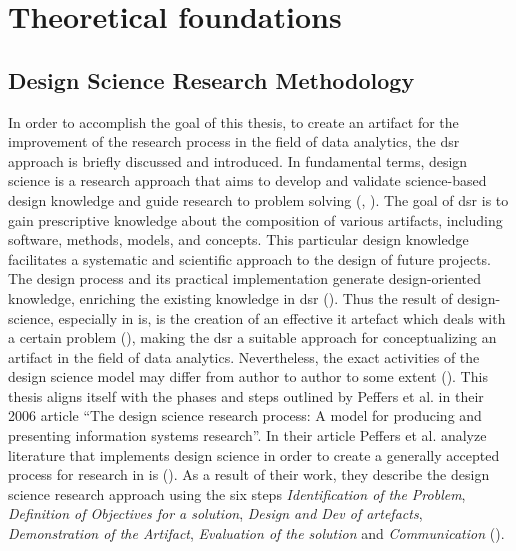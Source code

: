 \section{Theoretical foundations}


\subsection{Design Science Research Methodology}

In order to accomplish the goal of this thesis, to create an artifact for the improvement of the research process in the field of data analytics, the \ac{dsr} approach  is briefly discussed and introduced. In fundamental terms, design science is a research approach that aims to develop and validate science-based design knowledge and guide research to problem solving (\cite{Hevner.2004}, \cite{Dresch.2015}). The goal of \ac{dsr} is to gain prescriptive knowledge about the composition of various artifacts, including software, methods, models, and concepts. This particular design knowledge facilitates a systematic and scientific approach to the design of future projects. The design process and its practical implementation generate design-oriented knowledge, enriching the existing knowledge in \ac{dsr} (\cite{Hevner.2004}). Thus the result of design-science, especially in \ac{is}, is the creation of an effective \ac{it} artefact which deals with a certain problem (\cite{Hevner.2004}), making the \ac{dsr} a suitable approach for conceptualizing an artifact in the field of data analytics. Nevertheless, the exact activities of the design science model may differ from author to author to some extent (\cite{Fulcher.1996}). This thesis aligns itself with the phases and steps outlined by Peffers et al. in their 2006 article \enquote{The design science research process: A model for producing and presenting information systems research}. In their article Peffers et al. analyze literature that implements design science in order to create a generally accepted process for research in \ac{is} (\cite{Peffers.2006}). As a result of their work, they describe the design science research approach using the six steps \textit{Identification of the Problem}, \textit{Definition of Objectives for a solution}, \textit{Design and Dev of artefacts}, \textit{Demonstration of the Artifact}, \textit{Evaluation of the solution} and \textit{Communication} (\cite{Peffers.2006}). 


